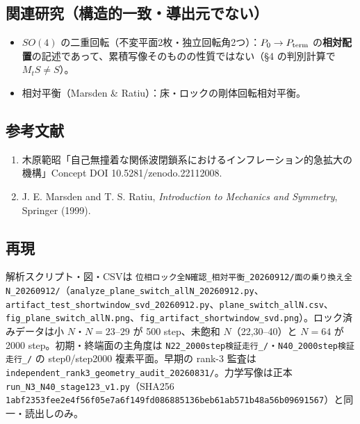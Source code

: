 \documentclass[
  a4paper,
]{ltjsarticle}
\providecommand{\tightlist}{%
  \setlength{\itemsep}{0pt}\setlength{\parskip}{0pt}}
\begin{document}
\subsection{関連研究（構造的一致・導出元でない）}\label{ux95a2ux9023ux7814ux7a76ux69cbux9020ux7684ux4e00ux81f4ux5c0eux51faux5143ux3067ux306aux3044}

\begin{itemize}
\tightlist
\item
  \(SO(4)\)
  の二重回転（不変平面2枚・独立回転角2つ）：\(P_0\to P_{\rm term}\)
  の\textbf{相対配置}の記述であって、累積写像そのものの性質ではない（§4
  の判別計算で \(M_tS\neq S\)）。
\item
  相対平衡（Marsden \& Ratiu）：床・ロックの剛体回転相対平衡。
\end{itemize}

\subsection{参考文献}\label{ux53c2ux8003ux6587ux732e}

\begin{enumerate}
\def\labelenumi{\arabic{enumi}.}
\tightlist
\item
  木原範昭「自己無撞着な関係波閉鎖系におけるインフレーション的急拡大の機構」Concept
  DOI 10.5281/zenodo.22112008.
\item
  J. E. Marsden and T. S. Ratiu, \emph{Introduction to Mechanics and
  Symmetry}, Springer (1999).
\end{enumerate}

\subsection{再現}\label{ux518dux73fe}

解析スクリプト・図・CSVは
\texttt{位相ロック全N確認\_相対平衡\_20260912/面の乗り換え全N\_20260912/}（\texttt{analyze\_plane\_switch\_allN\_20260912.py}、\texttt{artifact\_test\_shortwindow\_svd\_20260912.py}、\texttt{plane\_switch\_allN.csv}、\texttt{fig\_plane\_switch\_allN.png}、\texttt{fig\_artifact\_shortwindow\_svd.png}）。ロック済みデータは小
\(N\)・\(N=23\)--\(29\) が 500 step、未飽和 \(N\)（22,30--40）と
\(N=64\) が 2000 step。初期・終端面の主角度は
\texttt{N22\_2000step検証走行\_/}・\texttt{N40\_2000step検証走行\_/} の
step0/step2000 複素平面。早期の rank-3 監査は
\texttt{independent\_rank3\_geometry\_audit\_20260831/}。力学写像は正本
\texttt{run\_N3\_N40\_stage123\_v1.py}（SHA256
\texttt{1abf2353fee2e4f56f05e7a6f149fd086885136beb61ab571b48a56b09691567}）と同一・読出しのみ。
\end{document}
